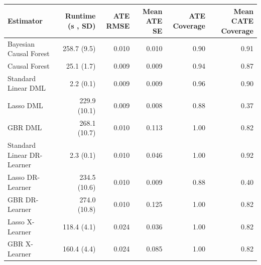 \begin{tabular}{lrrrrr}
\toprule
                 Estimator & Runtime (s , SD) &  ATE RMSE &  Mean ATE SE &  ATE Coverage &  Mean CATE Coverage \\
\midrule
    Bayesian Causal Forest &      258.7 (9.5) &     0.010 &        0.010 &          0.90 &                0.91 \\
             Causal Forest &       25.1 (1.7) &     0.009 &        0.009 &          0.94 &                0.87 \\
       Standard Linear DML &        2.2 (0.1) &     0.009 &        0.009 &          0.96 &                0.90 \\
                 Lasso DML &     229.9 (10.1) &     0.009 &        0.008 &          0.88 &                0.37 \\
                   GBR DML &     268.1 (10.7) &     0.010 &        0.113 &          1.00 &                0.82 \\
Standard Linear DR-Learner &        2.3 (0.1) &     0.010 &        0.046 &          1.00 &                0.92 \\
          Lasso DR-Learner &     234.5 (10.6) &     0.010 &        0.009 &          0.88 &                0.40 \\
            GBR DR-Learner &     274.0 (10.8) &     0.010 &        0.125 &          1.00 &                0.82 \\
           Lasso X-Learner &      118.4 (4.1) &     0.024 &        0.036 &          1.00 &                0.82 \\
             GBR X-Learner &      160.4 (4.4) &     0.024 &        0.085 &          1.00 &                0.82 \\
\bottomrule
\end{tabular}
